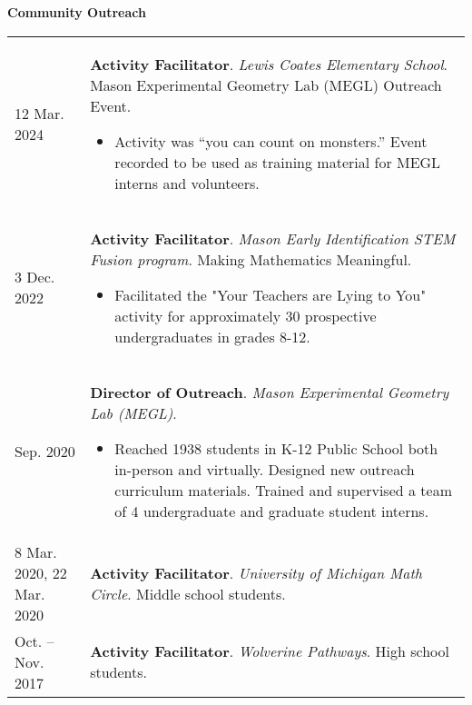     \vspace{-1em}
    

    \textbf{\large Community Outreach}
    
    \begin{center}
    {
    \renewcommand{\arraystretch}{1.2}
    \begin{longtable}{p{}  p{}}
    12 Mar.  2024 & \textbf{Activity Facilitator}. \textit{Lewis Coates Elementary School}.  Mason Experimental Geometry Lab (MEGL) Outreach Event. 
        \hspace{-1em}

        {\small
        \begin{itemize}
        \setlength{\parindent}{0em}
        \item[] Activity was ``you can count on monsters.'' Event recorded to be used as training material for MEGL interns and volunteers.
        \end{itemize}
        }
        \vspace{-1em}
         \\ 
3 Dec.  2022 & \textbf{Activity Facilitator}. \textit{Mason Early Identification STEM Fusion program}.  Making Mathematics Meaningful. 
        \hspace{-1em}

        {\small
        \begin{itemize}
        \setlength{\parindent}{0em}
        \item[] Facilitated the "Your Teachers are Lying to You" activity for approximately 30 prospective undergraduates in grades 8-12.
        \end{itemize}
        }
        \vspace{-1em}
         \\ 
 Sep.  2020 & \textbf{Director of Outreach}. \textit{Mason Experimental Geometry Lab (MEGL)}. 
        \hspace{-1em}

        {\small
        \begin{itemize}
        \setlength{\parindent}{0em}
        \item[] Reached 1938 students in K-12 Public School both in-person and virtually. Designed new outreach curriculum materials. Trained and supervised a team of 4 undergraduate and graduate student interns.
        \end{itemize}
        }
        \vspace{-1em}
         \\ 
8 Mar.  2020, 22 Mar.  2020 & \textbf{Activity Facilitator}. \textit{University of Michigan Math Circle}.  Middle school students.  \\ 
 Oct.  --  Nov.  2017 & \textbf{Activity Facilitator}. \textit{Wolverine Pathways}.  High school students. 
        \hspace{-1em}


\end{longtable}}
\end{center}
